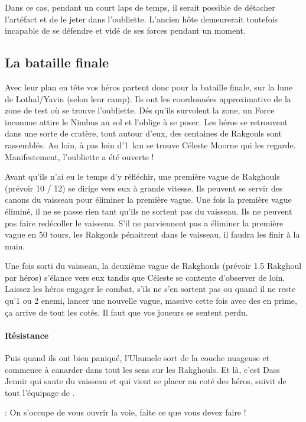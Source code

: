 Dans ce cas, pendant un court laps de temps, il serait possible de détacher l’artéfact et de le jeter dans l’oubliette. L’ancien hôte demeurerait toutefois incapable de se défendre et vidé de ses forces pendant un moment.

\subsection{La bataille finale}
Avec leur plan en tête vos héros partent donc pour la bataille finale, sur la lune de Lothal/Yavin (selon leur camp). Ils ont les coordonnées approximative de la zone de test où se trouve l’oubliette. Dés qu’ils survolent la zone, un Force inconnue attire le Nimbus au sol et l'oblige à se poser. Les héros se retrouvent dans une sorte de cratère, tout autour d’eux, des centaines de Rakgouls sont rassemblés. Au loin, à pas loin d’1~km se trouve Céleste Moorne qui les regarde. Manifestement, l’oubliette a été ouverte !

Avant qu’ils n’ai eu le temps d’y réfléchir, une première vague de Rakghouls (prévoir 10 / 12) se dirige vers eux à grande vitesse. Ils peuvent se servir des canons du vaisseau pour éliminer la première vague. Une fois la première vague éliminé, il ne se passe rien tant qu’ils ne sortent pas du vaisseau. Ils ne peuvent pas faire redécoller le vaisseau. S’il ne parviennent pas a éliminer la première vague en 50 tours, les Rakgouls pénaitrent dans le vaisseau, il faudra les finir à la main.

Une fois sorti du vaisseau, la deuxième vague de Rakghouls (prévoir 1.5 Rakghoul par héros) s’élance vers eux tandis que Céleste se contente d’observer de loin. Laissez les héros engager le combat, s’ils ne s’en sortent pas ou quand il ne reste qu’1 ou 2 enemi, lancer une nouvelle vague, massive cette fois avec des  en prime, ça arrive de tout les cotés. Il faut que vos joueurs se sentent perdu. 

\paragraph{Résistance}
Puis quand ils ont bien paniqué, l’Uhumele sort de la couche nuageuse et commence à canarder dans tout les sens sur les Rakghouls. Et là, c’est Dass Jennir qui saute du vaisseau et qui vient se placer au coté des héros, suivit de tout l'équipage de . 
\begin{quotebox}
    : On s’occupe de vous ouvrir la voie, faite ce que vous devez faire !
\end{quotebox}

